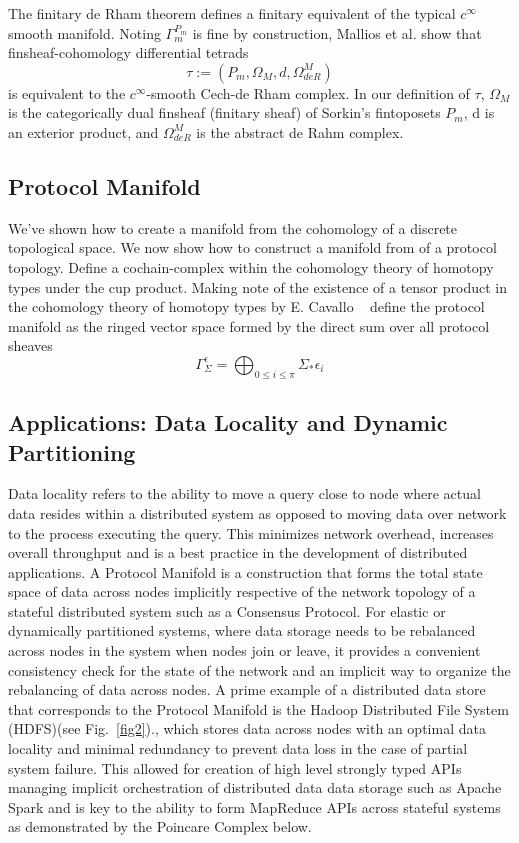 \documentclass[runningheads]{llncs}
\begin{document}
The finitary de Rham theorem defines a finitary equivalent of the typical $c^{\infty}$ smooth manifold. Noting $\Gamma^{P_m}_m$ is fine by construction, Mallios et al. show that finsheaf-cohomology differential tetrads
\begin{equation}
\tau := (P_m, \Omega_M, d, \Omega^M_{deR})
\end{equation}
is equivalent to the $c^{\infty}$-smooth Cech-de Rham complex. In our definition of $\tau$, $\Omega_M$ is the categorically dual finsheaf (finitary sheaf) of Sorkin's  fintoposets $P_m$, d is an exterior product, and $ \Omega^M_{deR}$ is the abstract de Rahm complex.

\subsection{Protocol Manifold}
We've shown how to create a manifold from the cohomology of a discrete topological space. We now show how to construct a manifold from of a protocol topology. Define a cochain-complex within the cohomology theory of homotopy types under the cup product. Making note of the existence of a tensor product in the cohomology theory of homotopy types by E. Cavallo ~\cite{ref_article9} define the protocol manifold as the ringed vector space formed by the direct sum over all protocol sheaves
\begin{equation}
\Gamma^\epsilon_{\Sigma} = \bigoplus_{0 \leq i \leq \pi} \Sigma_* \epsilon_i
\end{equation}

\subsection{Applications: Data Locality and Dynamic Partitioning}
Data locality refers to the ability to move a query close to node where actual data resides within a distributed system as opposed to moving data over network to the process executing the query. This minimizes network overhead, increases overall throughput and is a best practice in the development of distributed applications. A Protocol Manifold is a construction that forms the total state space of data across nodes implicitly respective of the network topology of a stateful distributed system such as a Consensus Protocol. For elastic or dynamically partitioned systems, where data storage needs to be rebalanced across nodes in the system when nodes join or leave, it provides a convenient consistency check for the state of the network and an implicit way to organize the rebalancing of data across nodes. A prime example of a distributed data store that corresponds to the Protocol Manifold is the Hadoop Distributed File System (HDFS)(see Fig.~\ref{fig2})., which stores data across nodes with an optimal data locality and minimal redundancy to prevent data loss in the case of partial system failure. This allowed for creation of high level strongly typed APIs managing implicit orchestration of distributed data data storage such as Apache Spark and is key to the ability to form MapReduce APIs across stateful systems as demonstrated by the Poincare Complex below.
\end{document}
